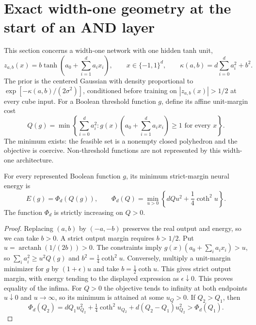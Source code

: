 \section{Exact width-one geometry at the start of an AND layer}
\label{sec:and-width-one}

This section concerns a width-one network with one hidden tanh unit,
\[
 z_{a,b}(x)=b\tanh\!\left(a_0+\sum_{i=1}^d a_i x_i\right),
 \qquad x\in\{-1,1\}^d,
 \qquad
 \kappa(a,b)=d\sum_{i=0}^d a_i^2+b^2.
\]
The prior is the centered Gaussian with density proportional to
$\exp[-\kappa(a,b)/(2\sigma^2)]$, conditioned before training on
$|z_{a,b}(x)|>1/2$ at every cube input.
For a Boolean threshold function $g$, define its affine unit-margin cost
\[
 Q(g)=\min\left\{\sum_{i=0}^d a_i^2:
       g(x)\left(a_0+\sum_{i=1}^d a_i x_i\right)\ge1
       \text{ for every }x\right\}.
\]
The minimum exists: the feasible set is a nonempty closed polyhedron
and the objective is coercive. Non-threshold functions are not represented
by this width-one architecture.

\begin{lemma}\label{lem:and-affine-reduction}
For every represented Boolean function $g$, its minimum strict-margin
neural energy is
\[
 E(g)=\Phi_d(Q(g)),\qquad
 \Phi_d(Q)=\min_{u>0}\left\{dQu^2+\frac14\coth^2u\right\}.
\]
The function $\Phi_d$ is strictly increasing on $Q>0$.
\end{lemma}
\begin{proof}
Replacing $(a,b)$ by $(-a,-b)$ preserves the real output and energy, so
we can take $b>0$. A strict output margin requires $b>1/2$. Put
$u=\operatorname{arctanh}(1/(2b))>0$. The constraints imply
$g(x)(a_0+\sum_i a_i x_i)>u$, so
$\sum_i a_i^2\ge u^2Q(g)$ and $b^2=\frac14\coth^2u$.
Conversely, multiply a unit-margin minimizer for $g$ by $(1+\epsilon)u$
and take $b=\frac12\coth u$. This gives strict output margin, with
energy tending to the displayed expression as $\epsilon\downarrow0$.
This proves equality of the infima. For $Q>0$ the objective tends to
infinity at both endpoints $u\downarrow0$ and $u\to\infty$, so its
minimum is attained at some $u_Q>0$. If $Q_2>Q_1$, then
\[
 \Phi_d(Q_2)
 =dQ_1u_{Q_2}^2+\tfrac14\coth^2u_{Q_2}
   +d(Q_2-Q_1)u_{Q_2}^2
 >\Phi_d(Q_1).
\]
\end{proof}

